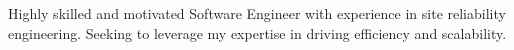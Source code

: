 

Highly skilled and motivated Software Engineer with experience in site reliability engineering. Seeking to leverage my expertise in driving efficiency and scalability.